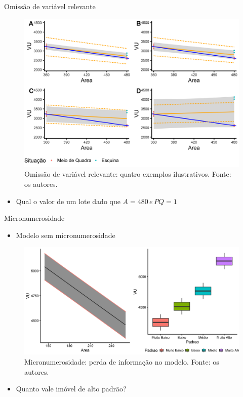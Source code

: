 \documentclass[9pt,ignorenonframetext,aspectratio=169]{beamer}
\providecommand{\tightlist}{%
  \setlength{\itemsep}{0pt}\setlength{\parskip}{0pt}}
\begin{document}
\begin{frame}{Omissão de variável relevante}
\protect\hypertarget{omissuxe3o-de-variuxe1vel-relevante}{}

\begin{figure}

{\centering \includegraphics[width=0.7\linewidth]{../../images/modelos-1} 

}

\caption{Omissão de variável relevante: quatro exemplos ilustrativos. Fonte: os autores.}\label{fig:unnamed-chunk-9}
\end{figure}

\begin{itemize}
\tightlist
\item
  Qual o valor de um lote dado que \(A = 480 \, e\, PQ = 1\)
\end{itemize}

\end{frame}

\begin{frame}{Micronumerosidade}
\protect\hypertarget{micronumerosidade}{}

\begin{itemize}[<+->]
\tightlist
\item
  \alert<1>{Modelo sem micronumerosidade}
\end{itemize}

\begin{figure}

{\centering \includegraphics[width=0.7\linewidth]{../../images/modelo-1} 

}

\caption{Micronumerosidade: perda de informação no modelo. Fonte: os autores.}\label{fig:unnamed-chunk-10}
\end{figure}

\begin{itemize}[<+->]
\tightlist
\item
  \alert<2>{Quanto vale imóvel de alto padrão?}
\end{itemize}

\end{frame}
\end{document}
